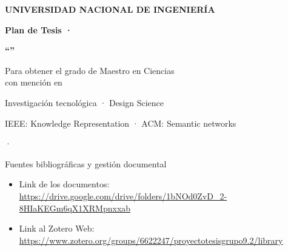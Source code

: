 \documentclass[aspectratio=169,11pt,spanish]{beamer}
\title[Plan de Tesis Grupo 10]{\tituloPlan}
\author{\autorAlex \and \autorJack}
\institute{\institucionDesarrollo · \grupo}
\date{\ciudad · \anioPlan}
\begin{document}
\begin{frame}[plain]
  \centering
  \vspace{0.1cm}
  {\large\bfseries UNIVERSIDAD NACIONAL DE INGENIERÍA\par}
  \vspace{0.2cm}
  {\small\bfseries Plan de Tesis · \grupo\par}
  \vspace{0.45cm}
  {\small\bfseries ``\tituloPlan''\par}
  \vspace{0.55cm}
  {\small Para obtener el grado de Maestro en Ciencias\\[0.12em]
  con mención en \mencionGrado\par}
  \vspace{0.5cm}
  {\small\bfseries \autorAlex\par}
  {\small\bfseries \autorJack\par}
  \vspace{0.35cm}
  {\small Investigación tecnológica · Design Science\par}
  {\small IEEE: Knowledge Representation · ACM: Semantic networks\par}
  \vspace{0.3cm}
  {\small \ciudad · \anioPlan\par}
\end{frame}

\begin{frame}{Fuentes bibliográficas y gestión documental}
  \marcadorNoExponer
  \vspace{0.35em}
  \begin{planpanel}
  \begin{itemize}
    \item Link de los documentos:\\[0.15em]
      {\small\url{https://drive.google.com/drive/folders/1bNOd0ZvD_2-8HIaKEGm6qX1XRMpnxxab}}
    \item Link al Zotero Web:\\[0.15em]
      {\small\url{https://www.zotero.org/groups/6622247/proyectotesisgrupo9.2/library}}
  \end{itemize}
  \end{planpanel}
\end{frame}
\end{document}

